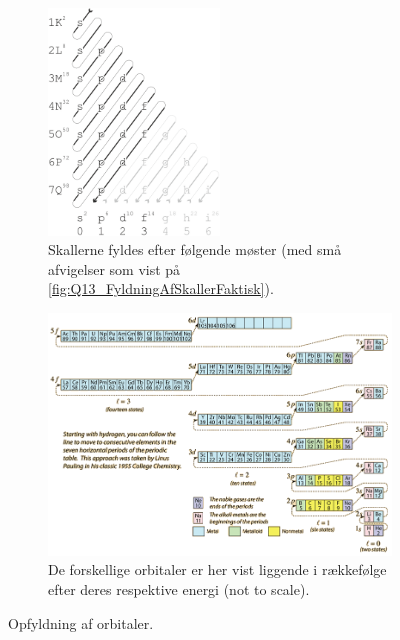 \begin{figure}[t]
    \centering
    \begin{subfigure}[t]{\textwidth}
        \centering
        \includegraphics[width=0.5\textwidth]{Q13/images/FyldningAfSkaller3.png}
        \caption{Skallerne fyldes efter følgende møster (med små afvigelser som vist på \cref{fig:Q13_FyldningAfSkallerFaktisk}).}
        \label{fig:Q13_FyldningAfSkaller1}
    \end{subfigure}
    \vfill
    \begin{subfigure}[t]{\textwidth}
        \centering
        \includegraphics[width=\textwidth]{Q13/images/FyldningAfSkaller2.png}
        \caption{De forskellige orbitaler er her vist liggende i rækkefølge efter deres respektive energi (not to scale).}
        \label{fig:Q13_FyldningAfSkaller2}
    \end{subfigure}
    \caption{Opfyldning af orbitaler.}
    \label{fig:Q13_FyldningAfSkaller}
\end{figure}

